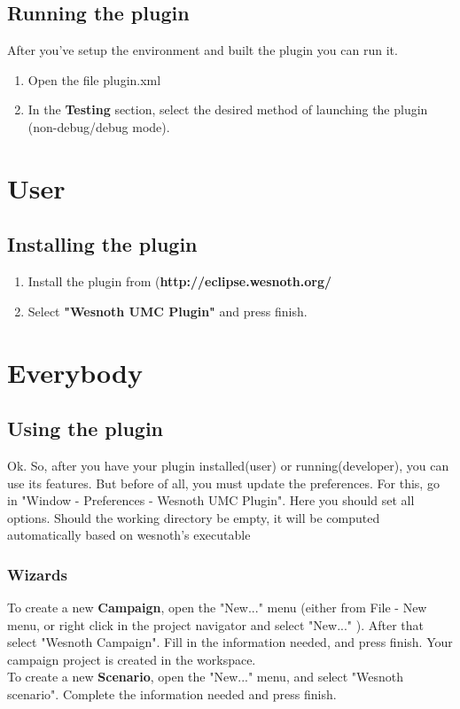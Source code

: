 \documentclass[10pt]{article}
\begin{document}
\subsection{Running the plugin}
After you've setup the environment and built the plugin you can run it.
\begin{enumerate}
\item Open the file plugin.xml
\item In the \textbf{Testing} section, select the desired method of launching the plugin
  (non-debug/debug mode).
\end{enumerate}

\section{User}
\subsection{Installing the plugin}
\begin{enumerate}
\item Install the plugin from (\textbf{http://eclipse.wesnoth.org/}
\item Select \textbf{"Wesnoth UMC Plugin"} and press finish.
\end{enumerate}


\section{Everybody}
\subsection{Using the plugin}
Ok. So, after you have your plugin installed(user) or running(developer), you can use its features.
But before of all, you must update the preferences. For this, go in "Window - Preferences - Wesnoth UMC Plugin".
Here you should set all options. Should the working directory be empty, it will be computed automatically
based on wesnoth's executable

\subsubsection{Wizards}
To create a new \textbf{Campaign}, open the "New..." menu (either from File - New menu, or right click in the
project navigator and select "New..." ). After that select "Wesnoth Campaign". Fill in the information needed,
and press finish. Your campaign project is created in the workspace. \\
To create a new \textbf{Scenario}, open the "New..." menu, and select "Wesnoth scenario".
Complete the information needed and press finish.
\end{document}
